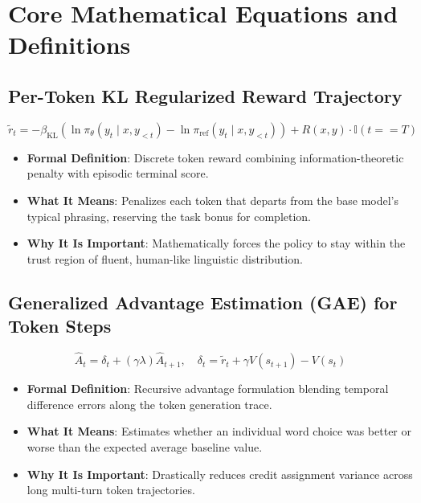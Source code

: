 \documentclass[11pt,a4paper]{article}
\theoremstyle{definition}
\begin{document}
\section{Core Mathematical Equations and Definitions}

\subsection{Per-Token KL Regularized Reward Trajectory}
{\boldmath
\begin{equation}
\tilde{r}_t = -\beta_{\text{KL}} \left( \ln \pi_\theta(y_t \mid x, y_{<t}) - \ln \pi_{\text{ref}}(y_t \mid x, y_{<t}) \right) + R(x, y)\cdot \mathbb{I}(t == T)
\end{equation}
}
\begin{itemize}
    \item \textbf{Formal Definition}: Discrete token reward combining information-theoretic penalty with episodic terminal score.
    \item \textbf{What It Means}: Penalizes each token that departs from the base model's typical phrasing, reserving the task bonus for completion.
    \item \textbf{Why It Is Important}: Mathematically forces the policy to stay within the trust region of fluent, human-like linguistic distribution.
\end{itemize}

\subsection{Generalized Advantage Estimation (GAE) for Token Steps}
{\boldmath
\begin{equation}
\hat{A}_t = \delta_t + (\gamma \lambda) \hat{A}_{t+1}, \quad \delta_t = \tilde{r}_t + \gamma V(s_{t+1}) - V(s_t)
\end{equation}
}
\begin{itemize}
    \item \textbf{Formal Definition}: Recursive advantage formulation blending temporal difference errors along the token generation trace.
    \item \textbf{What It Means}: Estimates whether an individual word choice was better or worse than the expected average baseline value.
    \item \textbf{Why It Is Important}: Drastically reduces credit assignment variance across long multi-turn token trajectories.
\end{itemize}
\end{document}

